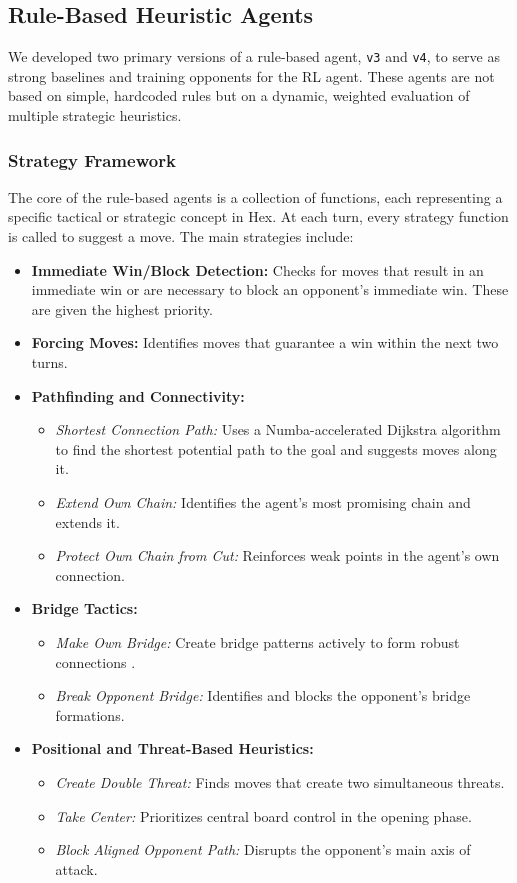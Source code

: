 \documentclass[conference]{IEEEtran}
\begin{document}
\subsection{Rule-Based Heuristic Agents}
We developed two primary versions of a rule-based agent, \texttt{v3} and \texttt{v4}, to serve as strong baselines and training opponents for the RL agent. These agents are not based on simple, hardcoded rules but on a dynamic, weighted evaluation of multiple strategic heuristics.

\subsubsection{Strategy Framework}
The core of the rule-based agents is a collection of functions, each representing a specific tactical or strategic concept in Hex. At each turn, every strategy function is called to suggest a move. The main strategies include:
\begin{itemize}
    \item \textbf{Immediate Win/Block Detection:} Checks for moves that result in an immediate win or are necessary to block an opponent's immediate win. These are given the highest priority.
    \item \textbf{Forcing Moves:} Identifies moves that guarantee a win within the next two turns.
    \item \textbf{Pathfinding and Connectivity:}
          \begin{itemize}
              \item \textit{Shortest Connection Path:} Uses a Numba-accelerated Dijkstra algorithm to find the shortest potential path to the goal and suggests moves along it.
              \item \textit{Extend Own Chain:} Identifies the agent's most promising chain and extends it.
              \item \textit{Protect Own Chain from Cut:} Reinforces weak points in the agent's own connection.
          \end{itemize}
    \item \textbf{Bridge Tactics:}
          \begin{itemize}
              \item \textit{Make Own Bridge:} Create bridge patterns actively to form robust connections \cite{b5}.
              \item \textit{Break Opponent Bridge:} Identifies and blocks the opponent's bridge formations.
          \end{itemize}
    \item \textbf{Positional and Threat-Based Heuristics:}
          \begin{itemize}
              \item \textit{Create Double Threat:} Finds moves that create two simultaneous threats.
              \item \textit{Take Center:} Prioritizes central board control in the opening phase.
              \item \textit{Block Aligned Opponent Path:} Disrupts the opponent's main axis of attack.
          \end{itemize}
\end{itemize}
\end{document}
